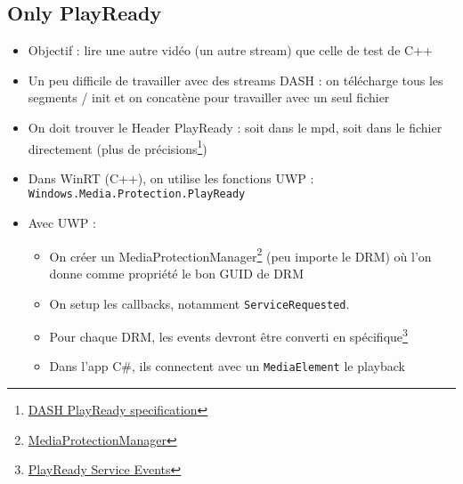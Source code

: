 \documentclass[french]{article}
\begin{document}
\subsection{Only PlayReady}
\begin{itemize}
	\item Objectif : lire une autre vidéo (un autre stream) que celle de test de C++
	\item Un peu difficile de travailler avec des streams DASH : on télécharge tous les segments / init et on concatène pour travailler avec un seul fichier
	\item On doit trouver le Header PlayReady : soit dans le mpd, soit dans le fichier directement (plus de précisions\footnote{\href{https://learn.microsoft.com/en-us/playready/specifications/mpeg-dash-playready}{DASH PlayReady specification}})
	\item Dans WinRT (C++), on utilise les fonctions UWP : \texttt{Windows.Media.Protection.PlayReady}
	\item Avec UWP :
	\begin{itemize}
		\item On créer un MediaProtectionManager\footnote{\href{https://learn.microsoft.com/en-ca/uwp/api/windows.media.protection.mediaprotectionmanager?view=winrt-22621}{MediaProtectionManager}} 
		(peu importe le DRM) où l'on donne comme propriété le bon GUID de DRM
		\item On setup les callbacks, notamment \texttt{ServiceRequested}. 
		\item Pour chaque DRM, les events devront être converti en spécifique\footnote{\href{https://learn.microsoft.com/en-ca/uwp/api/windows.media.protection.playready.iplayreadyservicerequest?view=winrt-22621}{PlayReady Service Events}}
		\item Dans l'app C\#, ils connectent avec un \texttt{MediaElement} le playback
	\end{itemize}
\end{itemize}
\end{document}
